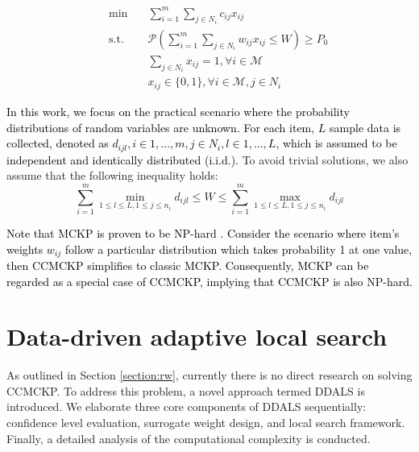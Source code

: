 \documentclass[lettersize,journal]{IEEEtran}
\begin{document}
\begin{subequations}
    \begin{align}
    & & \min \quad       &\sum\limits_{i=1}^m\sum\limits_{j\in N_i} c_{ij} x_{ij}    \\
    & & \text{s.t.}\quad &\mathcal{P}(\sum\limits_{i=1}^m\sum\limits_{j\in N_i} w_{ij} x_{ij}\leq W)\geq P_0 \label{cc}\\
    & &                  &\sum\limits_{j\in N_i}x_{ij}=1, \forall i \in \mathcal{M}\\
    & &                  &x_{ij}\in \{0,1\},\forall i \in \mathcal{M}, j\in N_i 
    \end{align}
    \label{formu_CCMCKP}
\end{subequations}

\textcolor{black}{
In this work, we focus on the practical scenario where the probability distributions of random variables are unknown. 
For each item, $L$ sample data is collected, denoted as $d_{ijl}, i\in {1,\ldots,m}, j\in N_i, l\in {1,\ldots,L}$, which is assumed to be independent and identically distributed (i.i.d.).}
To avoid trivial solutions, we also assume that the following inequality holds:
\begin{equation}
    \sum\limits_{i=1}^m \min_{1\leq l \leq L, 1\leq j\leq n_i}d_{ijl} \leq W\leq \sum\limits_{i=1}^m \max_{1\leq l \leq L, 1\leq j\leq n_i}d_{ijl}
\end{equation}

\textcolor{black}{
Note that MCKP is proven to be NP-hard \cite{sinha1979multiple}. 
Consider the scenario where item's weights $w_{ij}$ follow a particular distribution which takes probability 1 at one value, then CCMCKP simplifies to classic MCKP. 
Consequently, MCKP can be regarded as a special case of CCMCKP, implying that CCMCKP is also NP-hard.
}

\section{Data-driven adaptive local search}
\label{section:ddals}
As outlined in Section \ref{section:rw}, currently there is no direct research on solving CCMCKP.
To address this problem, a novel approach termed DDALS is introduced.
We elaborate three core components of DDALS sequentially: confidence level evaluation, surrogate weight design, and local search framework.
Finally, a detailed analysis of the computational complexity is conducted.
\end{document}
